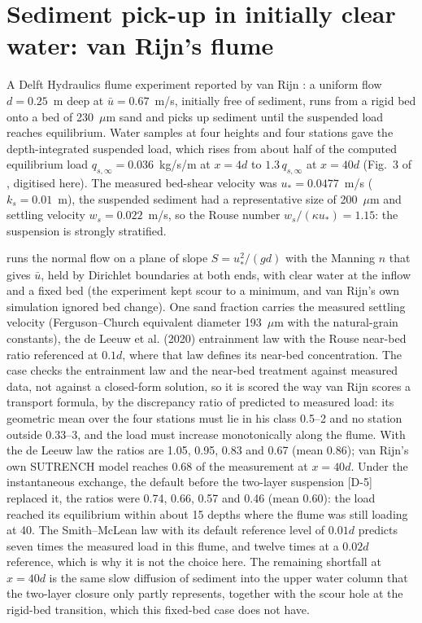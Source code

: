 
\section{Sediment pick-up in initially clear water: van Rijn's flume}

A Delft Hydraulics flume experiment reported by van Rijn \cite{vanRijn1986b,vanRijn1986c}:
a uniform flow $d = 0.25$~m deep at $\bar u = 0.67$~m/s, initially free of
sediment, runs from a rigid bed onto a bed of 230~$\mu$m sand and picks up
sediment until the suspended load reaches equilibrium. Water samples at four
heights and four stations gave the depth-integrated suspended load, which
rises from about half of the computed equilibrium load
$q_{s,\infty} = 0.036$~kg/s/m at $x = 4d$ to $1.3\,q_{s,\infty}$ at
$x = 40d$ (Fig.~3 of \cite{vanRijn1986c}, digitised here). The measured
bed-shear velocity was $u_* = 0.0477$~m/s ($k_s = 0.01$~m), the suspended
sediment had a representative size of 200~$\mu$m and settling velocity
$w_s = 0.022$~m/s, so the Rouse number $w_s/(\kappa u_*) = 1.15$: the
suspension is strongly stratified.

\anuga{} runs the normal flow on a plane of slope $S = u_*^2/(g d)$ with the
Manning $n$ that gives $\bar u$, held by Dirichlet boundaries at both ends,
with clear water at the inflow and a fixed bed (the experiment kept scour to
a minimum, and van Rijn's own simulation ignored bed change). One sand
fraction carries the measured settling velocity (Ferguson--Church equivalent
diameter 193~$\mu$m with the natural-grain constants), the de Leeuw et al.
(2020) entrainment law with the Rouse near-bed ratio referenced at $0.1 d$,
where that law defines its near-bed concentration. The case checks the
entrainment law and the near-bed treatment against measured data, not
against a closed-form solution, so it is scored the way van Rijn scores a
transport formula, by the discrepancy ratio of predicted to measured load:
its geometric mean over the four stations must lie in his class 0.5--2 and
no station outside 0.33--3, and the load must increase monotonically along
the flume. With the de Leeuw law the ratios are 1.05, 0.95, 0.83 and 0.67
(mean 0.86); van Rijn's own SUTRENCH model reaches 0.68 of the measurement
at $x = 40d$. Under the instantaneous exchange, the default before the
two-layer suspension [D-5] replaced it, the ratios were 0.74, 0.66, 0.57
and 0.46 (mean 0.60): the load reached its equilibrium within about 15
depths where the flume was still loading at 40. The Smith--McLean law with its default reference level of
$0.01 d$ predicts seven times the measured load in this flume, and twelve
times at a $0.02 d$ reference, which is why it is not the choice here.
The remaining shortfall at $x = 40d$ is the same slow diffusion of
sediment into the upper water column that the two-layer closure only
partly represents, together with the scour hole at the rigid-bed
transition, which this fixed-bed case does not have.

